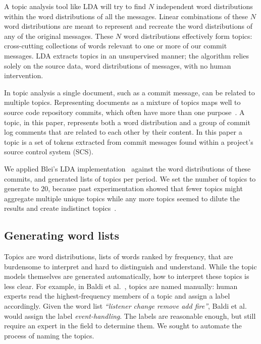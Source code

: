 \documentclass[]{sig-alternate}
\begin{document}
A topic analysis tool like LDA will try to find $N$ independent word distributions within the word distributions of all the messages. 
Linear combinations of these $N$ word distributions are meant to represent and recreate the word distributions of any of the original messages. 
These $N$ word distributions effectively form topics: cross-cutting collections of words relevant to one or more of our commit messages. 
LDA extracts topics in an unsupervised manner; the algorithm relies solely on the source data, word distributions of messages, with no human intervention.

In topic analysis a single document, such as a commit message, can be related to multiple topics. 
Representing documents as a mixture of topics maps well to source code repository commits, which often have more than one purpose~\cite{Hindle09ICSM}.  
A topic, in this paper, represents both a word distribution and a group of commit log comments that are related to each other by their content.  
In this paper a topic is a set of tokens extracted from commit messages found within a project's source control system (SCS).


We applied Blei's LDA implementation~\cite{Blei2003} against the word distributions of these commits, and generated lists of topics per period. 
We set the number of topics to generate to $20$, because past experimentation showed that fewer topics might aggregate multiple unique topics while any more topics seemed to dilute the results and create indistinct topics~\cite{Hindle09ICSM}. 

\subsection{Generating word lists}
\label{sec:genwordlist}




Topics are word distributions, lists of words ranked by frequency, that are burdensome to interpret and hard to distinguish and understand. 
While the topic models themselves are generated automatically, how to interpret these topics is less clear.
For example,
in Baldi et al.~\cite{Baldi2008}, topics are named manually: human experts read the highest-frequency members of a topic and assign a label accordingly. 
Given the word list \emph{``listener change remove add fire''}, Baldi et al. would assign the label \emph{event-handling}. 
The labels are reasonable enough, but still require an expert in the field to determine them. 
We sought to automate the process of naming the topics.
\end{document}
